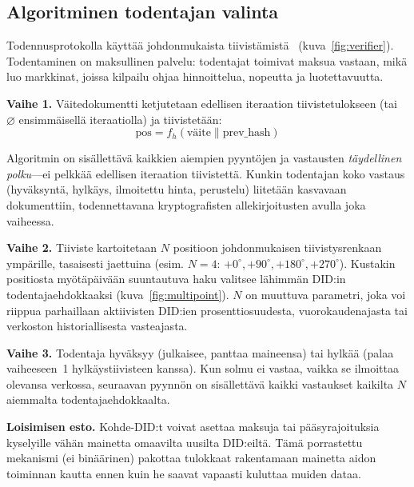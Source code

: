 \documentclass[11pt,a4paper,twocolumn]{article}
\begin{document}
\subsection{Algoritminen todentajan valinta}

Todennusprotokolla käyttää johdonmukaista tiivistämistä~\cite{karger1997} (kuva~\ref{fig:verifier}). Todentaminen on maksullinen palvelu: todentajat toimivat maksua vastaan, mikä luo markkinat, joissa kilpailu ohjaa hinnoittelua, nopeutta ja luotettavuutta.

\textbf{Vaihe 1.} Väitedokumentti ketjutetaan edellisen iteraation tiivistetulokseen (tai $\varnothing$ ensimmäisellä iteraatiolla) ja tiivistetään:
\begin{equation}
\text{pos} = f_h(\text{väite} \| \text{prev\_hash})
\label{eq:hash}
\end{equation}

Algoritmin on sisällettävä kaikkien aiempien pyyntöjen ja vastausten \emph{täydellinen polku}---ei pelkkää edellisen iteraation tiivistettä. Kunkin todentajan koko vastaus (hyväksyntä, hylkäys, ilmoitettu hinta, perustelu) liitetään kasvavaan dokumenttiin, todennettavana kryptografisten allekirjoitusten avulla joka vaiheessa.

\textbf{Vaihe 2.} Tiiviste kartoitetaan $N$ positioon johdonmukaisen tiivistysrenkaan ympärille, tasaisesti jaettuina (esim. $N=4$: $+0^{\circ}, +90^{\circ}, +180^{\circ}, +270^{\circ}$). Kustakin positiosta myötäpäivään suuntautuva haku valitsee lähimmän DID:in todentajaehdokkaaksi (kuva~\ref{fig:multipoint}). $N$ on muuttuva parametri, joka voi riippua parhaillaan aktiivisten DID:ien prosenttiosuudesta, vuorokaudenajasta tai verkoston historiallisesta vasteajasta.

\textbf{Vaihe 3.} Todentaja hyväksyy (julkaisee, panttaa maineensa) tai hylkää (palaa vaiheeseen~1 hylkäystiivisteen kanssa). Kun solmu ei vastaa, vaikka se ilmoittaa olevansa verkossa, seuraavan pyynnön on sisällettävä kaikki vastaukset kaikilta $N$ aiemmalta todentajaehdokkaalta.

\textbf{Loisimisen esto.} Kohde-DID:t voivat asettaa maksuja tai pääsyrajoituksia kyselyille vähän mainetta omaavilta uusilta DID:eiltä. Tämä porrastettu mekanismi (ei binäärinen) pakottaa tulokkaat rakentamaan mainetta aidon toiminnan kautta ennen kuin he saavat vapaasti kuluttaa muiden dataa.
\end{document}
